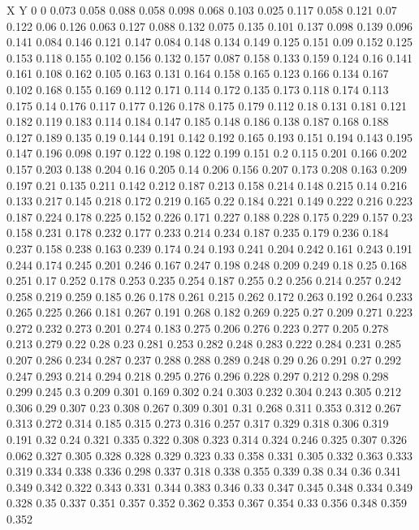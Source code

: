 X Y
0 0
0.073 0.058
0.088 0.058
0.098 0.068
0.103 0.025
0.117 0.058
0.121 0.07
0.122 0.06
0.126 0.063
0.127 0.088
0.132 0.075
0.135 0.101
0.137 0.098
0.139 0.096
0.141 0.084
0.146 0.121
0.147 0.084
0.148 0.134
0.149 0.125
0.151 0.09
0.152 0.125
0.153 0.118
0.155 0.102
0.156 0.132
0.157 0.087
0.158 0.133
0.159 0.124
0.16 0.141
0.161 0.108
0.162 0.105
0.163 0.131
0.164 0.158
0.165 0.123
0.166 0.134
0.167 0.102
0.168 0.155
0.169 0.112
0.171 0.114
0.172 0.135
0.173 0.118
0.174 0.113
0.175 0.14
0.176 0.117
0.177 0.126
0.178 0.175
0.179 0.112
0.18 0.131
0.181 0.121
0.182 0.119
0.183 0.114
0.184 0.147
0.185 0.148
0.186 0.138
0.187 0.168
0.188 0.127
0.189 0.135
0.19 0.144
0.191 0.142
0.192 0.165
0.193 0.151
0.194 0.143
0.195 0.147
0.196 0.098
0.197 0.122
0.198 0.122
0.199 0.151
0.2 0.115
0.201 0.166
0.202 0.157
0.203 0.138
0.204 0.16
0.205 0.14
0.206 0.156
0.207 0.173
0.208 0.163
0.209 0.197
0.21 0.135
0.211 0.142
0.212 0.187
0.213 0.158
0.214 0.148
0.215 0.14
0.216 0.133
0.217 0.145
0.218 0.172
0.219 0.165
0.22 0.184
0.221 0.149
0.222 0.216
0.223 0.187
0.224 0.178
0.225 0.152
0.226 0.171
0.227 0.188
0.228 0.175
0.229 0.157
0.23 0.158
0.231 0.178
0.232 0.177
0.233 0.214
0.234 0.187
0.235 0.179
0.236 0.184
0.237 0.158
0.238 0.163
0.239 0.174
0.24 0.193
0.241 0.204
0.242 0.161
0.243 0.191
0.244 0.174
0.245 0.201
0.246 0.167
0.247 0.198
0.248 0.209
0.249 0.18
0.25 0.168
0.251 0.17
0.252 0.178
0.253 0.235
0.254 0.187
0.255 0.2
0.256 0.214
0.257 0.242
0.258 0.219
0.259 0.185
0.26 0.178
0.261 0.215
0.262 0.172
0.263 0.192
0.264 0.233
0.265 0.225
0.266 0.181
0.267 0.191
0.268 0.182
0.269 0.225
0.27 0.209
0.271 0.223
0.272 0.232
0.273 0.201
0.274 0.183
0.275 0.206
0.276 0.223
0.277 0.205
0.278 0.213
0.279 0.22
0.28 0.23
0.281 0.253
0.282 0.248
0.283 0.222
0.284 0.231
0.285 0.207
0.286 0.234
0.287 0.237
0.288 0.288
0.289 0.248
0.29 0.26
0.291 0.27
0.292 0.247
0.293 0.214
0.294 0.218
0.295 0.276
0.296 0.228
0.297 0.212
0.298 0.298
0.299 0.245
0.3 0.209
0.301 0.169
0.302 0.24
0.303 0.232
0.304 0.243
0.305 0.212
0.306 0.29
0.307 0.23
0.308 0.267
0.309 0.301
0.31 0.268
0.311 0.353
0.312 0.267
0.313 0.272
0.314 0.185
0.315 0.273
0.316 0.257
0.317 0.329
0.318 0.306
0.319 0.191
0.32 0.24
0.321 0.335
0.322 0.308
0.323 0.314
0.324 0.246
0.325 0.307
0.326 0.062
0.327 0.305
0.328 0.328
0.329 0.323
0.33 0.358
0.331 0.305
0.332 0.363
0.333 0.319
0.334 0.338
0.336 0.298
0.337 0.318
0.338 0.355
0.339 0.38
0.34 0.36
0.341 0.349
0.342 0.322
0.343 0.331
0.344 0.383
0.346 0.33
0.347 0.345
0.348 0.334
0.349 0.328
0.35 0.337
0.351 0.357
0.352 0.362
0.353 0.367
0.354 0.33
0.356 0.348
0.359 0.352

